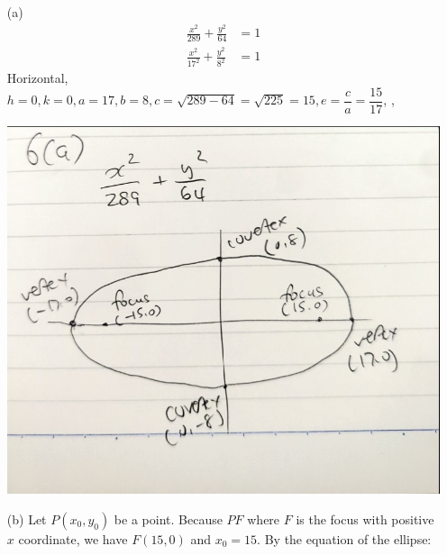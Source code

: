 \documentclass{article}
\begin{document}
\begin{itemize}
\item[(a)]
	\begin{align*}
		\frac{x^2}{289}+\frac{y^2}{64}&=1 \\
		\frac{x^2}{17^2}+\frac{y^2}{8^2}&=1
	\end{align*}
	Horizontal, $h=0,k=0,a=17,b=8,c=\sqrt{289-64}=\sqrt{225}=15,e=\dfrac{c}{a}=\dfrac{15}{17}$, , 
	
	\vspace*{15pt}
	\centering
	\includegraphics*[height=0.9\pagetotal-1in]{q6a.png}
	\flushleft

\item[(b)]
	Let $P(x_0,y_0)$ be a point. Because $PF$ where $F$ is the focus with positive $x$ coordinate, we have $F(15,0)$ and $x_0=15$. By the equation of the ellipse:


\end{itemize}
\end{document}
